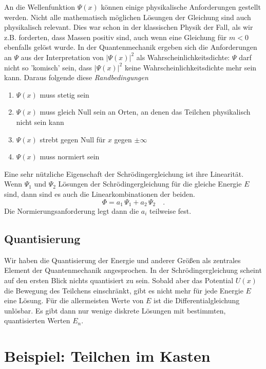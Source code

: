 An die Wellenfunktion $\Psi(x)$ können einige physikalische Anforderungen gestellt werden. Nicht alle mathematisch möglichen Lösungen der Gleichung sind auch physikalisch relevant. Dies war schon in der klassischen Physik der Fall, als wir z.B. forderten, dass Massen positiv sind, auch wenn eine Gleichung für $m<0$ ebenfalls gelöst wurde. In der Quantenmechanik ergeben sich die Anforderungen an $\Psi$ aus der Interpretation von $|\Psi(x)|^2$ als Wahrscheinlichkeitsdichte: $\Psi$ darf nicht so 'komisch' sein, dass $|\Psi(x)|^2$ keine Wahrscheinlichkeitsdichte mehr sein kann. Daraus folgende diese \emph{Randbedingungen}
\begin{enumerate} \setlength{\itemsep}{0pt}
    \item $\Psi(x)$ muss stetig sein
    \item $\Psi(x)$ muss gleich Null sein an Orten, an denen das Teilchen physikalisch nicht sein kann
    \item  $\Psi(x)$ strebt gegen Null für $x$ gegen $\pm \infty$
    \item $\Psi(x)$ muss normiert sein
\end{enumerate}


Eine sehr nützliche Eigenschaft der Schrödingergleichung ist ihre Linearität. Wenn $\Psi_1$ und $\Psi_2$ Lösungen der Schrödingergleichung für die gleiche Energie $E$ sind, dann sind es auch die Linearkombinationen der beiden.
\begin{equation}
    \Phi = a_1 \, \Psi_1 + a_2 \, \Psi_2 \quad .
\end{equation}
Die Normierungsanforderung legt dann die $a_i$ teilweise  fest.


\subsection{Quantisierung} 

Wir haben die Quantisierung der Energie und anderer Größen als zentrales Element der Quantenmechanik angesprochen. In der Schrödingergleichung scheint auf den ersten Blick nichts quantisiert zu sein. Sobald aber das Potential $U(x)$ die Bewegung des Teilchens einschränkt, gibt es nicht mehr für jede Energie $E$ eine Lösung. Für die allermeisten Werte von $E$ ist die Differentialgleichung unlösbar. Es gibt dann nur wenige diskrete Lösungen mit bestimmten, quantisierten Werten $E_n$.


\section{Beispiel: Teilchen im Kasten}

